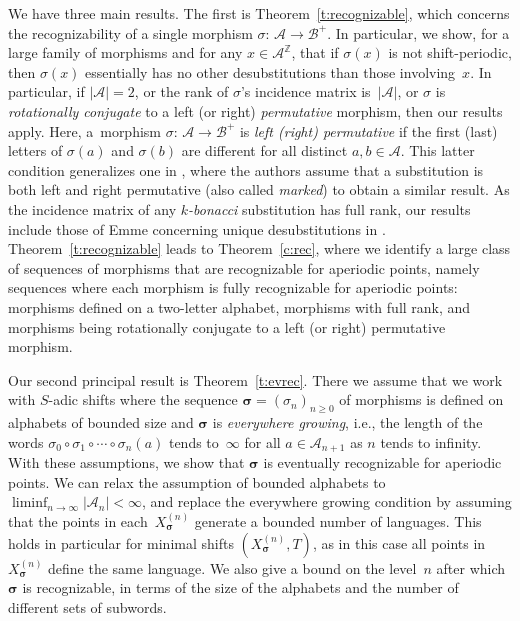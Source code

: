 \documentclass{amsart}
\theoremstyle{definition}
\theoremstyle{remark}
\numberwithin{equation}{section}
\begin{document}
We have three main results. 
The first is Theorem~\ref{t:recognizable}, which concerns the recognizability of a single  morphism $\sigma:\, \mathcal{A} \to \mathcal{B}^+$. In particular, we show, for a large family of morphisms and for any $x \in \mathcal{A}^\mathbb{Z}$, that if $\sigma(x)$ is not shift-periodic, then $\sigma(x)$ essentially has no other desubstitutions than those involving~$x$.
In particular, if $|\mathcal{A}| = 2$, or the rank of $\sigma$'s incidence matrix is~$|\mathcal{A}|$, or $\sigma$ is \emph{rotationally conjugate} to a left (or right) {\em permutative} morphism, then our results apply. 
Here, a~morphism $\sigma:\, \mathcal{A} \to \mathcal{B}^+$ is \emph{left (right) permutative} if the first (last) letters of $\sigma(a)$ and $\sigma(b)$ are different for all distinct $a,b \in \mathcal{A}$. 
This latter condition generalizes one in \cite{BedHubLep:15}, where the authors assume that a substitution is both left and right permutative (also called \emph{marked}) to obtain a similar result. 
As the incidence matrix of any \emph{$k$-bonacci} substitution has full rank, our results include those of Emme concerning unique desubstitutions in \cite{Emme:16}.
Theorem~\ref{t:recognizable} leads to Theorem~\ref{c:rec}, where we identify a large class of sequences of morphisms that are recognizable for aperiodic points, namely sequences where each morphism is fully recognizable for aperiodic points: morphisms defined on a two-letter alphabet, morphisms with full rank, and morphisms being rotationally conjugate to a left (or right) permutative morphism.

Our second principal result is Theorem~\ref{t:evrec}. 
There we assume that we work with $S$-adic shifts where the sequence $\boldsymbol{\sigma} = (\sigma_n)_{n\geq 0}$ of morphisms is defined on alphabets of bounded size and $\boldsymbol{\sigma}$ is \emph{everywhere growing}, i.e., the length of the words $\sigma_0 \circ \sigma_1 \circ \cdots \circ \sigma_n(a)$ tends to~$\infty$ for all $a \in \mathcal{A}_{n+1}$ as $n$ tends to infinity. 
With these assumptions, we show that $\boldsymbol{\sigma}$ is eventually recognizable for aperiodic points. 
We can relax the assumption of bounded alphabets to $\liminf_{n\to\infty} |\mathcal{A}_n| < \infty$, and replace the everywhere growing condition by assuming that the points in each~$X_{\boldsymbol{\sigma}}^{(n)}$  generate a bounded number of languages. This holds in particular for minimal shifts $(X_{\boldsymbol{\sigma}}^{(n)}, T)$, as in this case all points in $X_{\boldsymbol{\sigma}}^{(n)}$ define the same language.
We also give a bound on the level~$n$ after which $\boldsymbol{\sigma}$ is recognizable, in terms of the size of the alphabets and the number of different sets of subwords.
\end{document}
